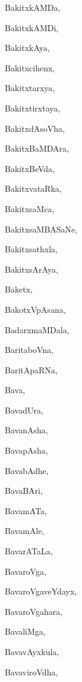\begin{multicols}{2}
{BakitxkAMDa}, \pageref{BakitxkAMDa}

{BakitxkAMDi}, \pageref{BakitxkAMDi}

{BakitxkAya}, \pageref{BakitxkAya}

{Bakitxcihenx}, \pageref{Bakitxcihenx}

{Bakitxtarxya}, \pageref{Bakitxtarxya}

{Bakitxtirxtaya}, \pageref{Bakitxtirxtaya}

{BakitxdAsoVha}, \pageref{BakitxdAsoVha}

{BakitxBaMDAra}, \pageref{BakitxBaMDAra}

{BakitxBeVda}, \pageref{BakitxBeVda}

{BakitxvataRka}, \pageref{BakitxvataRka}

{BakitxsaMca}, \pageref{BakitxsaMca}

{BakitxsaMBASaNe}, \pageref{BakitxsaMBASaNe}

{Bakitxsathxla}, \pageref{Bakitxsathxla}

{BakitxsArAya}, \pageref{BakitxsArAya}

{Baketx}, \pageref{Baketx}

{BakotxVpAsana}, \pageref{BakotxVpAsana}

{BadarxmaMDala}, \pageref{BadarxmaMDala}

{BaritaboVna}, \pageref{BaritaboVna}

{BaritApaRNa}, \pageref{BaritApaRNa}

{Bava}, \pageref{Bava}

{BavadUra}, \pageref{BavadUra}

{BavanAsha}, \pageref{BavanAsha}

{BavapAsha}, \pageref{BavapAsha}

{BavabAdhe}, \pageref{BavabAdhe}

{BavaBAri}, \pageref{BavaBAri}

{BavamATa}, \pageref{BavamATa}

{BavamAle}, \pageref{BavamAle}

{BavarATaLa}, \pageref{BavarATaLa}

{BavaroVga}, \pageref{BavaroVga}

{BavaroVgaveYdayx}, \pageref{BavaroVgaveYdayx}

{BavaroVgahara}, \pageref{BavaroVgahara}

{BavaliMga}, \pageref{BavaliMga}

{BavavAyxkula}, \pageref{BavavAyxkula}

{BavaviroVdha}, \pageref{BavaviroVdha}


\end{multicols}
